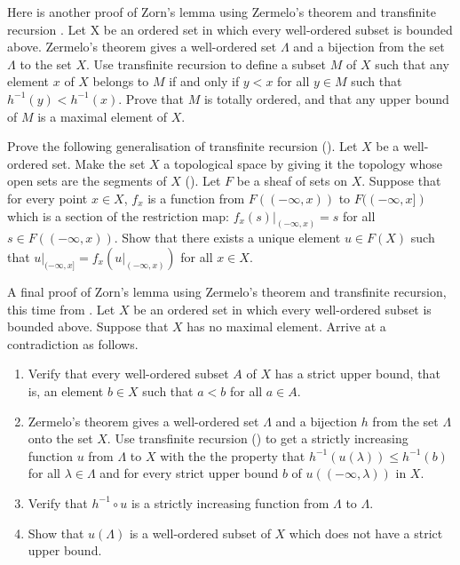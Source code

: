 \documentclass{article}
\begin{document}
\begin{exercise}
  \label{exe:5qa65h5w}
  Here is another proof of Zorn's lemma using Zermelo's theorem and
  transfinite recursion \parencite[Part~II, Chapter~14,
  Solution~1]{bib:uw2wsr3k}.  Let X be an ordered set in which every
  well-ordered subset is bounded above.  Zermelo's theorem gives a
  well-ordered set \(\Lambda\) and a bijection from the set
  \(\Lambda\) to the set \(X\).  Use transfinite recursion to define a
  subset \(M\) of \(X\) such that any element \(x\) of \(X\) belongs
  to \(M\) if and only if \(y < x\) for all \(y \in M\) such that
  \(h^{-1}(y) < h^{-1}(x)\).  Prove that \(M\) is totally ordered, and
  that any upper bound of \(M\) is a maximal element of \(X\).
\end{exercise}

\begin{exercise}
  \label{exe:x9ewqbv6}
  Prove the following generalisation of transfinite recursion
  ().  Let \(X\) be a well-ordered set.  Make the
  set \(X\) a topological space by giving it the topology whose open
  sets are the segments of \(X\) ().  Let \(F\) be
  a sheaf of sets on \(X\).  Suppose that for every point \(x \in X\),
  \(f_x\) is a function from \(F((-\infty, x))\) to
  \(F((-\infty, x])\) which is a section of the restriction map:
  \(f_x(s) \vert_{(-\infty, x)} = s\) for all
  \(s \in F((-\infty, x))\).  Show that there exists a unique element
  \(u \in F(X)\) such that
  \(u \vert_{(-\infty, x]} = f_x(u \vert_{(-\infty, x)})\) for all
  \(x \in X\).
\end{exercise}

\begin{exercise}
  \label{exe:k8tmok20}
  A final proof of Zorn's lemma using Zermelo's theorem and
  transfinite recursion, this time from \textcite[Chapter~XVI, \S4,
  Theorem~1]{bib:embpmrus}.  Let \(X\) be an ordered set in which
  every well-ordered subset is bounded above.  Suppose that \(X\) has
  no maximal element.  Arrive at a contradiction as follows.
  \begin{enumerate}
  \item Verify that every well-ordered subset \(A\) of \(X\) has a
    strict upper bound, that is, an element \(b \in X\) such that
    \(a < b\) for all \(a \in A\).
  \item Zermelo's theorem gives a well-ordered set \(\Lambda\) and a
    bijection \(h\) from the set \(\Lambda\) onto the set \(X\).  Use
    transfinite recursion () to get a strictly
    increasing function \(u\) from \(\Lambda\) to \(X\) with the the
    property that \(h^{-1}(u(\lambda)) \leq h^{-1}(b)\) for all
    \(\lambda \in \Lambda\) and for every strict upper bound \(b\) of
    \(u((-\infty, \lambda))\) in \(X\).
  \item Verify that \(h^{-1} \circ u\) is a strictly increasing
    function from \(\Lambda\) to \(\Lambda\).
  \item Show that \(u(\Lambda)\) is a well-ordered subset of \(X\)
    which does not have a strict upper bound.
  \end{enumerate}
\end{exercise}
\end{document}
